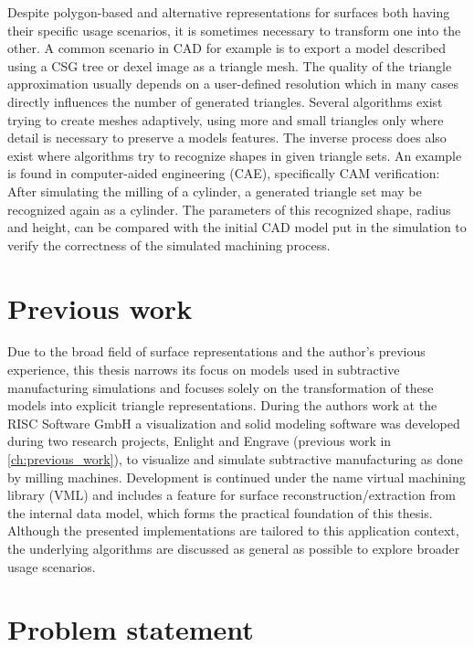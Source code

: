 Despite polygon-based and alternative representations for surfaces both having their specific usage scenarios, it is sometimes necessary to transform one into the other.
A common scenario in CAD for example is to export a model described using a CSG tree or dexel image as a triangle mesh.
The quality of the triangle approximation usually depends on a user-defined resolution which in many cases directly influences the number of generated triangles.
Several algorithms exist trying to create meshes adaptively, using more and small triangles only where detail is necessary to preserve a models features.
%
The inverse process does also exist where algorithms try to recognize shapes in given triangle sets.
An example is found in computer-aided engineering (CAE), specifically CAM verification: After simulating the milling of a cylinder, a generated triangle set may be recognized again as a cylinder. The parameters of this recognized shape, \eg radius and height, can be compared with the initial CAD model put in the simulation to verify the correctness of the simulated machining process.


\section{Previous work}

Due to the broad field of surface representations and the author's previous experience, this thesis narrows its focus on models used in subtractive manufacturing simulations and focuses solely on the transformation of these models into explicit triangle representations.
During the authors work at the RISC Software GmbH a visualization and solid modeling software was developed during two research projects, Enlight and Engrave (\cf previous work in \cref{ch:previous_work}), to visualize and simulate subtractive manufacturing as done by milling machines.
Development is continued under the name virtual machining library (VML) and includes a feature for surface reconstruction/extraction from the internal data model, which forms the practical foundation of this thesis.
Although the presented implementations are tailored to this application context, the underlying algorithms are discussed as general as possible to explore broader usage scenarios.


\section{Problem statement}
\label{sec:problem}

